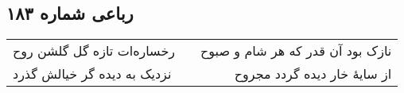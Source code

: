 \begin{center}
\section*{رباعی شماره ۱۸۳}
\label{sec:sh183}
\begin{longtable}{l p{0.5cm} r}
رخساره‌ات تازه گل گلشن روح
&&
نازک بود آن قدر که هر شام و صبوح
\\
نزدیک به دیده گر خیالش گذرد
&&
از سایهٔ خار دیده گردد مجروح
\\
\end{longtable}
\end{center}
